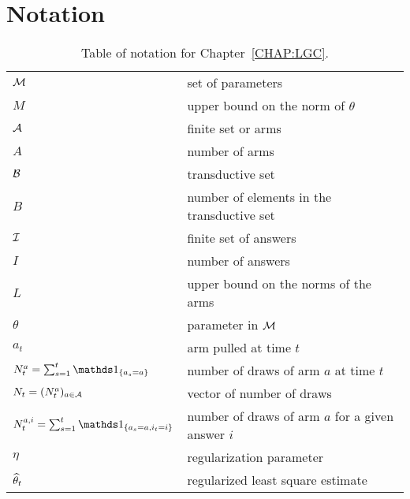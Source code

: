 \section{Notation}\label{app:lgc.notations}

\begin{table}[ht]
	\centering
	\caption{Table of notation for Chapter~\ref{CHAP:LGC}.}
	\begin{tabular}{@{}l|l@{}}
		\toprule
		\thead{Notation} & \thead{Meaning} \\ \midrule
		$\mathcal{M}$ & set of parameters \\
        $M$ & upper bound on the norm of $\theta$\\
		$\mathcal{A}$ & finite set or arms  \\
        $A$ & number of arms \\
        $\mathcal{B}$ & transductive set \\
        $B$ & number of elements in the transductive set \\
        $\mathcal{I}$ & finite set of answers \\
        $I$ & number of answers \\
        $L$ & upper bound on the norms of the arms\\
        $\theta$ & parameter in $\mathcal{M}$ \\
        $a_t$ & arm pulled at time $t$ \\
        $N_t^a = \sum_{s=1}^t \ind_{\{a_s = a\}}$ & number of draws of arm $a$ at time $t$\\
        $N_t =(N_t^a)_{a\in\mathcal{A}}$ & vector of number of draws\\
        $N_t^{a,i} = \sum_{s=1}^t \ind_{\{a_s = a, i_t = i\}}$ & number of draws of arm $a$ for a given answer $i$\\
        $\eta$ & regularization parameter\\
        $\widehat{\theta}_t$ & regularized least square estimate\\
		\bottomrule
	\end{tabular}
\end{table}
